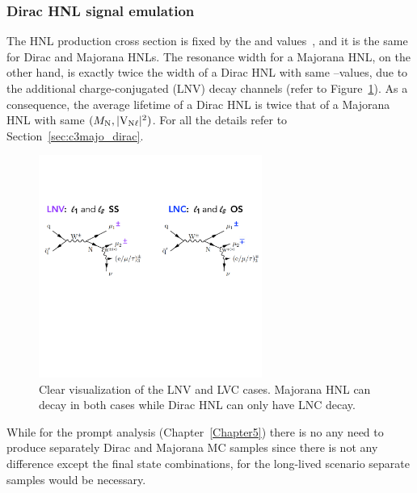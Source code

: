 \subsubsection{Dirac HNL signal emulation}\label{sec:c4diracmajo}
The HNL production cross section is fixed by the \mhnl and \mixpar
values~\cite{Degrande_2016,heavyN}, and it is the same for Dirac and
Majorana HNLs.
The resonance width for a Majorana HNL, on the other hand, is exactly
twice the width of a Dirac HNL with same \mhnl--\mixpar values, due to
the additional charge-conjugated (LNV) decay channels (refer to Figure~\ref{fig:dirac_majo}).
As a consequence, the average lifetime of a Dirac HNL is twice that of
a Majorana HNL with same $(M_{\mathrm{N}},\mathrm{|V_{\mathrm{N}\ell}|^2})$. For all the details refer
to Section~\ref{sec:c3majo_dirac}.
\begin{figure}[h!]
\centering
 \includegraphics[clip,trim=0cm 7cm 0cm 3cm, width=0.65\textwidth]{Figures/c4/dirac_majo2}
  \caption{Clear visualization of the LNV and LVC cases. Majorana HNL
    can decay in both cases while Dirac HNL can only have LNC decay.}
  \label{fig:dirac_majo}
\end{figure}

While for the prompt analysis (Chapter~\ref{Chapter5}) there is no any
need to produce separately Dirac and Majorana MC samples since there is
not any difference except the final state combinations, for the
long-lived scenario separate samples would be necessary.

